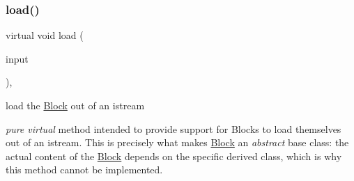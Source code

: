 \subsubsection{\texorpdfstring{load()}{load()}}
{\footnotesize\ttfamily virtual void load (\begin{DoxyParamCaption}\item[{std\+::istream \&}]{input }\end{DoxyParamCaption})\hspace{0.3cm}{\ttfamily [protected]}, {}}



load the \mbox{\hyperlink{class_s_m_spp__di__unipi__it_1_1_block}{Block}} out of an istream 

{\itshape pure virtual} method intended to provide support for Blocks to load themselves out of an istream. This is precisely what makes \mbox{\hyperlink{class_s_m_spp__di__unipi__it_1_1_block}{Block}} an {\itshape abstract} base class\+: the actual content of the \mbox{\hyperlink{class_s_m_spp__di__unipi__it_1_1_block}{Block}} depends on the specific derived class, which is why this method cannot be implemented. \mbox{\label{class_s_m_spp__di__unipi__it_1_1_block_a9524f314b064aafbd8d2f8a398b797a2}} 
